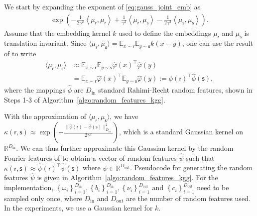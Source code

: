 \documentclass[english]{article}
\theoremstyle{plain}
\theoremstyle{plain}
\begin{document}
We start by expanding the  exponent 
of \eqref{eq:gauss_joint_emb} as
%
\begin{align*}
  \exp\left(-\frac{1}{2\gamma^{2}}\left\langle \mu_{\mathsf{r}},\mu_{\mathsf{r}}\right\rangle +\frac{1}{\gamma^{2}}\left\langle \mu_{\mathsf{r}},\mu_{\mathsf{s}}\right\rangle -\frac{1}{2\gamma^{2}}\left\langle \mu_{\mathsf{s}},\mu_{\mathsf{s}}\right\rangle \right).
\end{align*}
%
Assume that the embedding kernel $k$ used to define the embeddings $\mu_\mathsf{r}$ 
and $\mu_\mathsf{s}$ is translation invariant. Since 
$\langle \mu_{\mathsf{r}},\mu_{\mathsf{s}}  \rangle
= \mathbb{E}_{x \sim \mathsf{r}} \mathbb{E}_{y \sim \mathsf{s}} k(x-y)$, one can use 
the result of \cite{Rahimi2007} to write
%
\begin{align*}
 \langle \mu_{\mathsf{r}},\mu_{\mathsf{s}}  \rangle
 & \approx \mathbb{E}_{x \sim \mathsf{r}} \mathbb{E}_{y \sim \mathsf{s}} 
   \hat{\varphi}(x)^\top \hat{\varphi}(y) \nonumber \\ 
 & = \mathbb{E}_{x \sim \mathsf{r}} 
   \hat{\varphi}(x)^\top \mathbb{E}_{y \sim \mathsf{s}}  \hat{\varphi}(y) 
 := \hat{\phi}(\mathsf{r})^\top \hat{\phi}(\mathsf{s}),
\end{align*}
%
where the mappings $\hat{\phi}$ are $D_\mathrm{in}$ standard Rahimi-Recht
random features, shown in Steps 1-3 of
Algorithm~\ref{algo:random_features_kgg}.



With the approximation of $\langle \mu_{\mathsf{r}},\mu_{\mathsf{s}}  \rangle$,
we have
$\kappa(\mathsf{r},
\mathsf{s}) \approx \exp\left(-\frac{\|\hat{\phi}
(\mathsf{r})-\hat{\phi}(\mathsf{s})\|_{D_\mathrm{in}}^{2}}{2\gamma^{2}}\right)$,
%
which is a standard Gaussian kernel on $\mathbb{R}^{D_\mathrm{in}}$.
We can thus further approximate this Gaussian kernel 
%
%
by the random Fourier features of \citeauthor{Rahimi2007} to obtain a vector 
of random features $\hat{\psi}$ such that 
$\kappa(\mathsf{r}, \mathsf{s}) \approx \hat{\psi}(\mathsf{r})^\top \hat{\psi}(\mathsf{s})$
where $\hat{\psi} \in \mathbb{R}^{D_\mathrm{out}}$. 
Pseudocode for generating the random features $\hat{\psi}$ is given in Algorithm~\ref{algo:random_features_kgg}. 
For the implementation, $\left\{ \omega_{i}\right\}
_{i=1}^{D_\mathrm{in}},\left\{ b_{i}\right\} _{i=1}^{D_\mathrm{in}},\left\{
    \nu_{i}\right\} _{i=1}^{D_\mathrm{out}}$ 
and $\left\{ c_{i}\right\} _{i=1}^{D_\mathrm{out}}$ need to be sampled only
once, where $D_\mathrm{in}$ and
$D_\mathrm{out}$ are the number of random features used. 
In the experiments, we use a Gaussian kernel for $k$.
\end{document}
